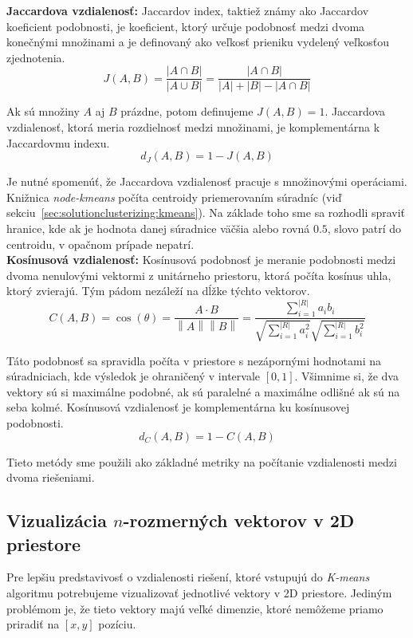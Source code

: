 \noindent\textbf{Jaccardova vzdialenosť:} Jaccardov index, taktiež známy ako Jaccardov
koeficient podobnosti, je koeficient, ktorý určuje podobnosť medzi dvoma konečnými množinami
a je definovaný ako veľkosť prieniku vydelený veľkosťou zjednotenia.
$$J(A,B) = \frac{|A\cap B|}{|A\cup B|} = \frac{|A\cap B|}{|A| + |B| - |A\cap B|}$$

Ak sú množiny $A$ aj $B$ prázdne, potom definujeme $J(A,B) = 1$.
Jaccardova vzdialenosť, ktorá meria rozdielnosť medzi množinami, je komplementárna
k Jaccardovmu indexu.
$$d_J(A,B) = 1 - J(A,B)$$

Je nutné spomenúť, že Jaccardova vzdialenosť pracuje s množinovými operáciami. Knižnica
\textit{node-kmeans} počíta centroidy priemerovaním súradníc
(viď sekciu~\ref{sec:solutionclusterizing:kmeans}). Na základe toho sme sa rozhodli
spraviť hranice, kde ak je hodnota danej súradnice väčšia alebo rovná $0.5$, slovo
patrí do centroidu, v opačnom prípade nepatrí.\\

\noindent\textbf{Kosínusová vzdialenosť:} Kosínusová podobnosť je meranie podobnosti
medzi dvoma nenulovými vektormi z unitárneho priestoru, ktorá počíta kosínus uhla,
ktorý zvierajú. Tým pádom nezáleží na dĺžke týchto vektorov.
$$C(A,B)=\cos(\theta)=
\frac{A\cdot B}{\left\lVert A \right\rVert \left\lVert B \right\rVert}=
\frac{\displaystyle \sum_{i=1}^{|R|} a_ib_i}{\sqrt{\displaystyle \sum_{i=1}^{|R|} a_i^2} \sqrt{\displaystyle \sum_{i=1}^{|R|} b_i^2}}$$

Táto podobnosť sa spravidla počíta v priestore s nezápornými hodnotami na súradniciach,
kde výsledok je ohraničený v intervale $[0,1]$. Všimnime si, že dva vektory sú si
maximálne podobné, ak sú paralelné a maximálne odlišné ak sú na seba kolmé.
Kosínusová vzdialenosť je komplementárna ku kosínusovej podobnosti.
$$d_C(A,B)=1-C(A,B)$$

Tieto metódy sme použili ako základné metriky na počítanie vzdialenosti medzi
dvoma riešeniami.

\subsection{Vizualizácia $n$-rozmerných vektorov v 2D priestore}
\label{sec:solutionclusterizing:tsne}

Pre lepšiu predstavivosť o vzdialenosti riešení, ktoré vstupujú do \textit{K-means}
algoritmu potrebujeme vizualizovať jednotlivé vektory v 2D priestore. Jediným
problémom je, že tieto vektory majú veľké dimenzie, ktoré nemôžeme priamo priradiť
na $[x,y]$ pozíciu.

